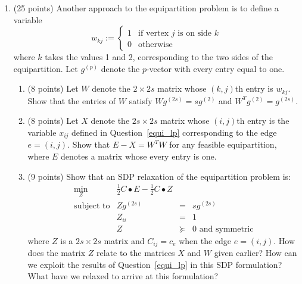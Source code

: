 \begin{enumerate}
  \item (25 points)
Another approach to the equipartition problem is to define a variable
\begin{displaymath}
w_{kj} := \left\{ \begin{array}{ll}
1 & \mbox{if vertex $j$ is on side $k$}  \\
0 & \mbox{otherwise}
\end{array}  \right.
\end{displaymath}
where $k$ takes the values 1 and 2, corresponding to the two sides
of the equipartition.
Let $g^{(p)}$ denote the $p$-vector with every entry equal to one.
\begin{enumerate}
\item (8 points)
Let $W$ denote the $2 \times 2s$ matrix whose $(k,j)$th entry is $w_{kj}$.
Show that the entries of $W$ satisfy $Wg^{(2s)}=sg^{(2)}$ and
$W^Tg^{(2)}=g^{(2s)}$.
\item (8 points)
Let $X$ denote the $2s \times 2s$ matrix whose $(i,j)$th entry is
the variable $x_{ij}$ defined in Question~\ref{equi_lp} corresponding
to the edge $e=(i,j)$.
Show that $E-X=W^TW$ for any feasible equipartition, where $E$ denotes
a matrix whose every entry is one.
\item (9 points)
Show that an SDP relaxation of the equipartition problem is:
\begin{displaymath}
\begin{array}{lrcl}
\min_Z & \frac{1}{2}C \bullet E - \frac{1}{2} C \bullet Z \\
\mbox{subject to} & Zg^{(2s)} & = & sg^{(2s)} \\
& Z_{ii} & = & 1 \\
& Z & \succeq & 0 \mbox{ and symmetric}
\end{array}
\end{displaymath}
where $Z$ is a $2s \times 2s$ matrix and $C_{ij}=c_e$ when the edge
$e=(i,j)$.
How does the matrix $Z$ relate to the matrices $X$ and $W$ given earlier?
How can we exploit the results of Question~\ref{equi_lp} in this
SDP formulation?
What have we relaxed to arrive at this formulation?
\end{enumerate}


\end{enumerate}



